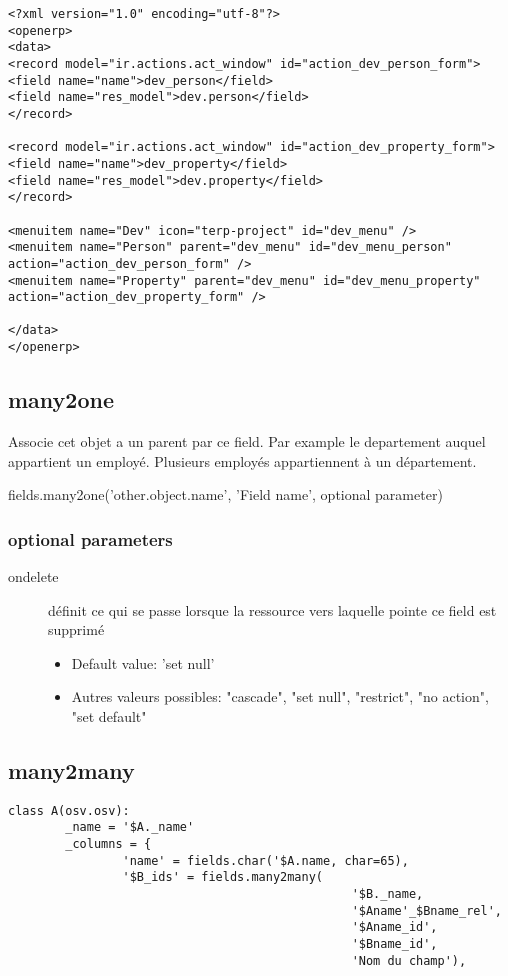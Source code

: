 \documentclass[12pt,a4paper]{article}
\begin{document}
\begin{verbatim}
<?xml version="1.0" encoding="utf-8"?>
<openerp>
<data>
<record model="ir.actions.act_window" id="action_dev_person_form">
<field name="name">dev_person</field>
<field name="res_model">dev.person</field>
</record>

<record model="ir.actions.act_window" id="action_dev_property_form">
<field name="name">dev_property</field>
<field name="res_model">dev.property</field>
</record>

<menuitem name="Dev" icon="terp-project" id="dev_menu" />
<menuitem name="Person" parent="dev_menu" id="dev_menu_person" action="action_dev_person_form" />
<menuitem name="Property" parent="dev_menu" id="dev_menu_property" action="action_dev_property_form" />

</data>
</openerp>
\end{verbatim}

\subsection{many2one}
\label{sec:many2one}
Associe cet objet a un parent par ce field. Par example le departement auquel appartient un employé. Plusieurs employés appartiennent à un département.

fields.many2one('other.object.name', 'Field name', optional parameter)

\subsubsection{optional parameters}
\label{sec:optional_par}

\begin{description}
\item[ondelete] définit ce qui se passe lorsque la ressource vers laquelle pointe ce field est supprimé
  \begin{itemize}
    \item Default value: 'set null'
    \item Autres valeurs possibles: "cascade", "set null", "restrict", "no action", "set default"
  \end{itemize}
\end{description}


\subsection{many2many}
\label{sec:m2m}
\begin{verbatim}
class A(osv.osv):
        _name = '$A._name'
        _columns = {
                'name' = fields.char('$A.name, char=65),
                '$B_ids' = fields.many2many(
                                                '$B._name,
                                                '$Aname'_$Bname_rel',
                                                '$Aname_id',
                                                '$Bname_id',
                                                'Nom du champ'),
\end{verbatim}
\end{document}
